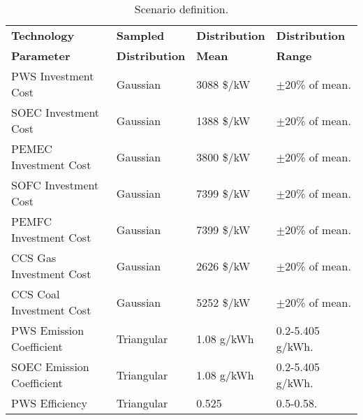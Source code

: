 \begin{table}[!ht]
	\caption{Scenario definition.}
	\vspace{0.1in}
	\begin{tabularx}{1.1\textwidth}{p{} p{} p{}p{}}
\hline 
\textbf{Technology}  & \textbf{Sampled} & \textbf{Distribution}& \textbf{Distribution}\\
\textbf{Parameter} & \textbf{Distribution} & \textbf{Mean}& \textbf{Range}\\
\hline
\gls{PWS} Investment Cost       & Gaussian    & 3088 \$/kW & $\pm$20\% of mean. \\                  
\gls{SOEC} Investment Cost      & Gaussian    & 1388 \$/kW & $\pm$20\% of mean.\\                  
\gls{PEMEC} Investment Cost     & Gaussian    & 3800 \$/kW & $\pm$20\% of mean.\\                  
\gls{SOFC} Investment Cost      & Gaussian    & 7399 \$/kW & $\pm$20\% of mean.\\                  
\gls{PEMFC} Investment Cost     & Gaussian    & 7399 \$/kW & $\pm$20\% of mean.\\                  
\gls{CCS} Gas Investment Cost   & Gaussian    & 2626 \$/kW & $\pm$20\% of mean.\\                  
\gls{CCS} Coal Investment Cost  & Gaussian    & 5252 \$/kW & $\pm$20\% of mean.\\
\gls{PWS} Emission Coefficient  & Triangular  & 1.08 g/kWh & 0.2-5.405 g/kWh. \\                  
\gls{SOEC} Emission Coefficient & Triangular  & 1.08 g/kWh & 0.2-5.405 g/kWh. \\
\gls{PWS} Efficiency            & Triangular  & 0.525 & 0.5-0.58. \\                               
\hline
	\end{tabularx}
\label{sa-vars}
\end{table}